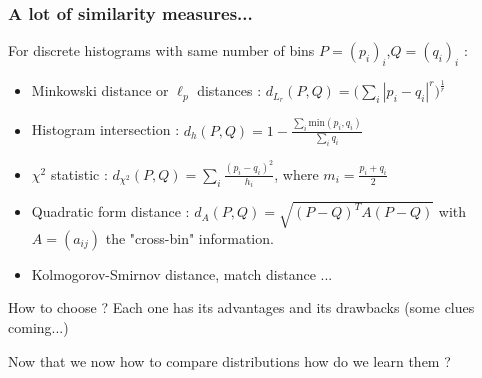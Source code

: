 \documentclass[french,9pt]{beamer}
\begin{document}
\begin{frame}
\frametitle{A lot of similarity measures...  \cite{Rubner2000}}

For discrete histograms with same number of bins $P=(p_{i})_{i}$,$Q=(q_{i})_{i}$ :

\begin{itemize}
\item Minkowski distance or $\ell_{p}$ distances : $d_{L_{r}}(P,Q)= \big(\sum_{i} |p_{i}-q_{i}|^{r}\big)^{\frac{1}{r}}$
\item Histogram intersection : $d_{h}(P,Q)= 1-\frac{\sum_{i} \text{min}(p_{i},q_{i})}{\sum_{i}q_{i}}$
\item$\chi^{2}$ statistic : $d_{\chi^{2}}(P,Q)= \sum_{i} \frac{(p_{i}-q_{i})^{2}}{h_{i}}$, where $m_{i}=\frac{p_{i}+q_{i}}{2}$
\item Quadratic form distance : $d_{A}(P,Q)=\sqrt{(P-Q)^{T} A (P-Q)}$ with $A=(a_{ij})$ the "cross-bin" information.
\item Kolmogorov-Smirnov distance, match distance ...
\end{itemize}

\pause 

How to choose ? Each one has its advantages and its drawbacks (some clues coming...)

\pause 
Now that we now how to compare distributions how do we learn them ?

\end{frame}

\end{document}
